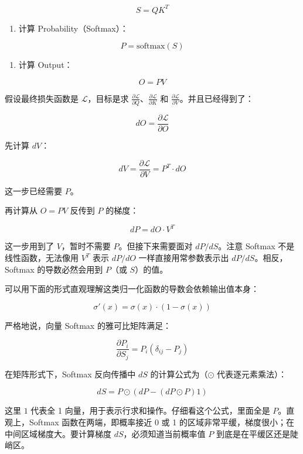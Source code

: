 \[
S = QK^T
\]

\begin{enumerate}
\def\labelenumi{\arabic{enumi}.}
\setcounter{enumi}{1}
\tightlist
\item
  计算 Probability（Softmax）：
\end{enumerate}

\[
P = \mathrm{softmax}(S)
\]

\begin{enumerate}
\def\labelenumi{\arabic{enumi}.}
\setcounter{enumi}{2}
\tightlist
\item
  计算 Output：
\end{enumerate}

\[
O = PV
\]

假设最终损失函数是 \(\mathcal{L}\)，目标是求 \(\frac{\partial \mathcal{L}}{\partial Q}\)、\(\frac{\partial \mathcal{L}}{\partial K}\) 和 \(\frac{\partial \mathcal{L}}{\partial V}\)。并且已经得到了：

\[
dO = \frac{\partial \mathcal{L}}{\partial O}
\]

先计算 \(dV\)：

\[
dV = \frac{\partial \mathcal{L}}{\partial V} = P^T \cdot dO
\]

这一步已经需要 \(P\)。

再计算从 \(O = PV\) 反传到 \(P\) 的梯度：

\[
dP = dO \cdot V^T
\]

这一步用到了 \(V\)，暂时不需要 \(P\)。但接下来需要面对 \(dP/dS\)。注意 Softmax 不是线性函数，无法像用 \(V^T\) 表示 \(dP/dO\) 一样直接用常参数表示出 \(dP/dS\)。相反，Softmax 的导数必然会用到 \(P\)（或 \(S\)）的值。

可以用下面的形式直观理解这类归一化函数的导数会依赖输出值本身：

\[
\sigma'(x) = \sigma(x)\cdot(1-\sigma(x))
\]

严格地说，向量 Softmax 的雅可比矩阵满足：

\[
\frac{\partial P_i}{\partial S_j} = P_i(\delta_{ij}-P_j)
\]

在矩阵形式下，Softmax 反向传播中 \(dS\) 的计算公式为（\(\odot\) 代表逐元素乘法）：

\[
dS = P \odot \left(dP - (dP \odot P)1\right)
\]

这里 \(1\) 代表全 1 向量，用于表示行求和操作。仔细看这个公式，里面全是 \(P\)。直观上，Softmax 函数在两端，即概率接近 0 或 1 的区域非常平缓，梯度很小；在中间区域梯度大。要计算梯度 \(dS\)，必须知道当前概率值 \(P\) 到底是在平缓区还是陡峭区。

